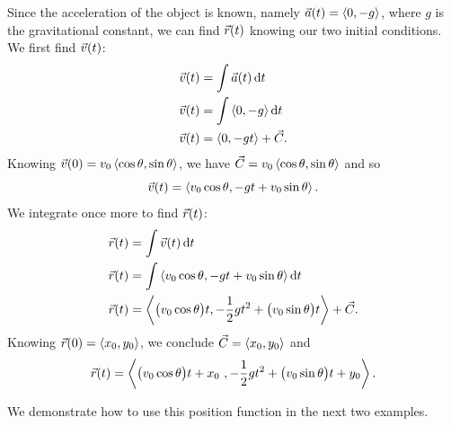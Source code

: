 
Since the acceleration of the object is known, namely $\vec a(t) =\left\langle 0,-g\right\rangle$, where $g$ is the gravitational constant, we can find $\vec r(t)$ knowing our two initial conditions. We first find $\vec v(t)$:
\begin{align*}
\vec v(t) &= \int \vec a(t) \operatorname{d}\! t\\
\vec v(t) &= \int\left\langle 0,-g\right\rangle\operatorname{d}\! t\\
\vec v(t) &=\left\langle 0,-gt\right\rangle+ \vec C.
\end{align*}
Knowing $\vec v(0) = v_0\left\langle \cos \theta,\sin \theta\right\rangle$, we have $\vec C = v_0\left\langle \cos\theta,\sin\theta\right\rangle$ and so
\[\vec v(t) =\left\langle v_0\cos \theta, -gt+v_0\sin\theta\right\rangle.\]
We integrate once more to find $\vec r(t)$:
\begin{align*}
\vec r(t) &= \int \vec v(t)\operatorname{d}\! t \\
\vec r(t) &= \int\left\langle v_0\cos \theta, -gt+v_0\sin\theta\right\rangle\operatorname{d}\! t\\
\vec r(t) &=\left\langle \bigl(v_0\cos \theta\bigr)t, -\frac12gt^2+\bigl(v_0\sin\theta\bigr)t\right\rangle+ \vec C.
\end{align*}
Knowing $\vec r(0) =\left\langle x_0,y_0\right\rangle$, we conclude $\vec C =\left\langle x_0,y_0\right\rangle$ and
\begin{equation}
\vrt
=\bracket{\bigl(v_0\cos\theta\bigr)t+x_0\ ,-\frac12gt^2+\bigl(v_0\sin\theta\bigr)t+y_0}.
\label{idea:projectile}
\end{equation}


We demonstrate how to use this position function in the next two examples.

